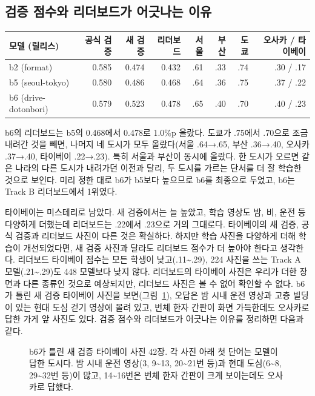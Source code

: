 \documentclass[11pt]{article}
\begin{document}
\subsection*{검증 점수와 리더보드가 어긋나는 이유}

\begin{center}\footnotesize
\begin{tabular}{lrrrrrrr}
\toprule
모델 (릴리스) & 공식 검증 & 새 검증 & 리더보드 & 서울 & 부산 & 도쿄 & 오사카 / 타이베이 \\
\midrule
b2 (format) & 0.585 & 0.474 & 0.432 & .61 & .33 & .74 & .30 / .17 \\
b5 (seoul-tokyo) & 0.580 & 0.486 & 0.468 & .64 & .36 & .75 & .37 / .22 \\
b6 (drive-dotonbori) & 0.579 & 0.523 & 0.478 & .65 & .40 & .70 & .40 / .23 \\
\bottomrule
\end{tabular}
\end{center}

b6의 리더보드는 b5의 0.468에서 0.478로 1.0\%p 올랐다. 도쿄가 .75에서 .70으로 조금 내려간 것을 빼면, 나머지 네 도시가 모두 올랐다(서울 .64→.65, 부산 .36→.40, 오사카 .37→.40, 타이베이 .22→.23). 특히 서울과 부산이 동시에 올랐다. 한 도시가 오르면 같은 나라의 다른 도시가 내려가던 이전과 달리, 두 도시를 가르는 단서를 더 잘 학습한 것으로 보인다. 미리 정한 대로 b6가 b5보다 높으므로 b6를 최종으로 두었고, b6는 Track B 리더보드에서 1위였다.

타이베이는 미스테리로 남았다. 새 검증에서는 늘 높았고, 학습 영상도 밤, 비, 운전 등 다양하게 더했는데 리더보드는 .22에서 .23으로 거의 그대로다. 타이베이의 새 검증, 공식 검증과 리더보드 사진이 다른 것은 확실하다. 하지만 학습 사진을 다양하게 더해 학습이 개선되었다면, 새 검증 사진과 달라도 리더보드 점수가 더 높아야 한다고 생각한다. 리더보드 타이베이 점수는 모든 학생이 낮고(.11\textasciitilde .29), 224 사진을 쓰는 Track A 모델(.21\textasciitilde .29)도 448 모델보다 낮지 않다. 리더보드의 타이베이 사진은 우리가 더한 장면과 다른 종류인 것으로 예상되지만, 리더보드 사진은 볼 수 없어 확인할 수 없다. b6가 틀린 새 검증 타이베이 사진을 보면(그림~\ref{fig:b6taipei}), 오답은 밤 시내 운전 영상과 고층 빌딩이 있는 현대 도심 걷기 영상에 몰려 있고, 번체 한자 간판이 화면 가득한데도 오사카로 답한 가게 앞 사진도 있다. 검증 점수와 리더보드가 어긋나는 이유를 정리하면 다음과 같다.

\begin{figure}[H]\centering
{}
\caption{b6가 틀린 새 검증 타이베이 사진 42장. 각 사진 아래 첫 단어는 모델이 답한 도시다. 밤 시내 운전 영상(3, 9\textasciitilde 13, 20\textasciitilde 21번 등)과 현대 도심(6\textasciitilde 8, 29\textasciitilde 32번 등)이 많고, 14\textasciitilde 16번은 번체 한자 간판이 크게 보이는데도 오사카로 답했다.}
\label{fig:b6taipei}
\end{figure}
\end{document}
